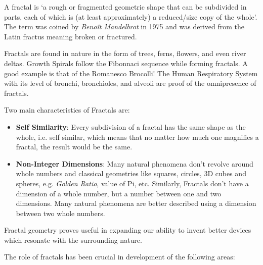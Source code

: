 \documentclass{resonance}
\begin{document}
A fractal is ‘a rough or fragmented geometric shape that can be subdivided in parts, each of which is (at least approximately) a reduced/size copy of the whole’. The term was coined by \textit{Benoît Mandelbrot} in 1975 and was derived from the Latin fractus meaning broken or fractured.

Fractals are found in nature in the form of trees, ferns, flowers, and even river deltas. Growth Spirals follow the Fibonnaci sequence while forming fractals. A good example is that of the Romanesco Brocolli! The Human Respiratory System with its level of bronchi, bronchioles, and alveoli are proof of the omnipresence of fractals.

Two main characteristics of Fractals are:
\begin{itemize}
    \item \textbf{Self Similarity}: Every subdivision of a fractal has the same shape as the whole, i.e. self similar, which means that no matter how much one magnifies a fractal, the result would be the same.
    

    \item \textbf{Non-Integer Dimensions}: Many natural phenomena don’t revolve around whole numbers and classical geometries like squares, circles, 3D cubes and spheres, e.g. \textit{Golden Ratio}, value of Pi, etc. Similarly, Fractals don’t have a dimension of a whole number, but a number between one and two dimensions. Many natural phenomena are better described using a dimension between two whole numbers.
\end{itemize}

Fractal geometry proves useful in expanding our ability to invent better devices which resonate with the surrounding nature.

The role of fractals has been crucial in development of the following areas:

\end{document}
